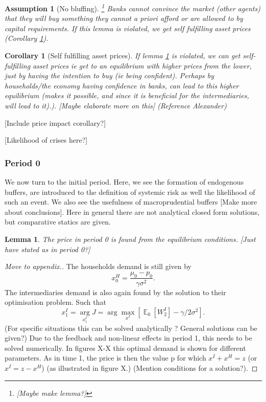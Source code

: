 \documentclass[11pt]{article}
\DeclareMathOperator{\E}{\mathbb{E}} %
\newtheorem{assumption}{Assumption}%
\newtheorem{lemma}{Lemma}%
\newtheorem{corollary}{Corollary}
\begin{document}
\begin{assumption}[No bluffing] \label{l_noBluffing}
 \footnote{[Maybe make lemma?]} Banks cannot convince the market (other agents) that they will buy something they cannot a priori afford or are allowed to by capital requirements. If this lemma is violated, we get self fulfilling asset prices (Corollary \ref{c_selfFulfilling}).
\end{assumption}

\begin{corollary}[Self fulfilling asset prices] \label{c_selfFulfilling}
If lemma \ref{l_noBluffing} is violated, we can get self-fulfilling asset prices ie get to an equilibrium with higher prices from the lower, just by having the intention to buy (ie being confident). Perhaps by households/the economy having confidence in banks, can lead to this higher equilibrium (makes it possible, and since it is beneficial for the intermediaries, will lead to it).). [Maybe elaborate more on this] (Reference Alexander)
\end{corollary}

[Include price impact corollary?]

[Likelihood of crises here?]




\subsubsection*{Period 0}


We now turn to the initial period. Here, we see the formation of endogenous buffers, are introduced to the definition of systemic risk as well the likelihood of such an event. We also see the usefulness of macroprudential buffers [Make more about conclusions]. Here in general there are not analytical closed form solutions, but comparative statics are given.

\begin{lemma}
The price in period 0 is found from the equilibrium conditions. [Just have stated as in period 0?]
\end{lemma}
\begin{proof}
[Move to appendix.]
The households demand is still given by
\begin{equation}
x^H_0 = \frac{\mu_0-p_0}{\gamma \sigma^2}.
\end{equation}
The intermediaries demand is also again found by the solution to their optimisation problem. Such that
\begin{equation}
x^{I}_1 = \underset{x^{I}_1}{\arg} J = \arg \max_{x^I}\left[\E_0[W^I_2] - \gamma/2\sigma^2\right].
\end{equation}
(For specific situations this can be solved analytically ? General solutions can be given?) Due to the feedback and non-linear effects in period 1, this needs to be solved numerically. In figures X-X this optimal demand is shown for different parameters.
As in time 1, the price is then the value p for which $x^I+x^H = z$ (or$x^I= z - x^H $)  (as illustrated in figure X.) (Mention conditions for a solution?).
\end{proof}
\end{document}
